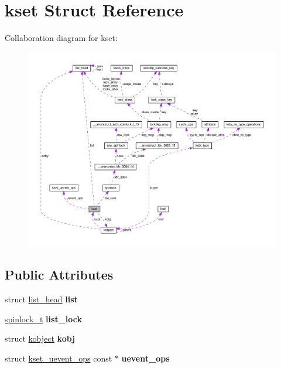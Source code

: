 \hypertarget{structkset}{}\section{kset Struct Reference}
\label{structkset}


Collaboration diagram for kset\+:
\nopagebreak
\begin{figure}[H]
\begin{center}
\leavevmode
\includegraphics[width=350pt]{structkset__coll__graph}
\end{center}
\end{figure}
\subsection*{Public Attributes}
\begin{DoxyCompactItemize}
\item 
\hypertarget{structkset_aff708e149d73bcf456ae2222d2a0b4be}{}struct \hyperlink{structlist__head}{list\+\_\+head} {\bfseries list}\label{structkset_aff708e149d73bcf456ae2222d2a0b4be}

\item 
\hypertarget{structkset_af2c844e9e37559d15bf8c42f826c8479}{}\hyperlink{structspinlock}{spinlock\+\_\+t} {\bfseries list\+\_\+lock}\label{structkset_af2c844e9e37559d15bf8c42f826c8479}

\item 
\hypertarget{structkset_a345d9a2c329363061830813111e3ecbb}{}struct \hyperlink{structkobject}{kobject} {\bfseries kobj}\label{structkset_a345d9a2c329363061830813111e3ecbb}

\item 
\hypertarget{structkset_a219b6958a0b880cf79f919d30709b400}{}struct \hyperlink{structkset__uevent__ops}{kset\+\_\+uevent\+\_\+ops} const $\ast$ {\bfseries uevent\+\_\+ops}\label{structkset_a219b6958a0b880cf79f919d30709b400}

\end{DoxyCompactItemize}



